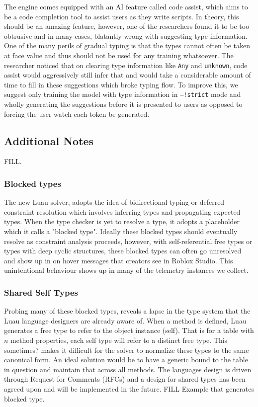 \documentclass[acmsmall,screen,review,anonymous]{acmart}
\newcommand{\code}[1]{\texttt{#1}}
\newcommand{\Any}{\code{Any}}
\begin{document}
\label{s:place:2}
The engine comes equipped with an AI feature called code assist, which aims 
to be a code completion tool to assist users as they write scripts. In theory, 
this should be an amazing feature, however, one of the researchers
found it to be too obtrusive and in many cases, blatantly wrong with suggesting type information.
One of the many perils of gradual typing is that the types cannot often be taken at 
face value and thus should not be used for any training whatsoever. The researcher 
noticed that on clearing type information like \Any{} and \code{unknown}, code assist
would aggressively still infer that and would take a considerable amount of time to fill 
in these suggestions which broke typing flow. To improve this, we suggest only training the model 
with type information in \code{--!strict} mode and wholly generating the suggestions before it is 
presented to users as opposed to forcing the user watch each token be generated.

\subsection{Additional Notes}
FILL.

\subsubsection{Blocked types}
\label{s:add}
The new Luau solver, adopts the idea of bidirectional typing or deferred constraint resolution 
which involves inferring types and propagating expected types. When the 
type checker is yet to resolve a type, it adopts a placeholder which it calls a "blocked type". 
Ideally these blocked types should eventually resolve as constraint analysis proceeds, however, 
with self-referential free types or types with deep cyclic structures, these blocked types can often 
go unresolved and show up in on hover messages that creators see in Roblox Studio. This unintentional 
behaviour shows up in many of the telemetry instances we collect.

\subsubsection{Shared Self Types}
\label{s:add:1}
Probing many of these blocked types, reveals a lapse in the type system that the Luau language designers 
are already aware of. When a method is defined, Luau generates a free type to refer to the object instance (self).
That is for a table with $n$ method properties, each self type will refer to a distinct free type. This sometimes? 
makes it difficult for the solver to normalize these types to the same canonical form. An ideal solution
would be to have a generic bound to the table in question and maintain that across all methods. The languages 
design is driven through Request for Comments (RFCs) and a design for shared types has been agreed upon and 
will be implemented in the future.
FILL Example that generates blocked type.
\end{document}
